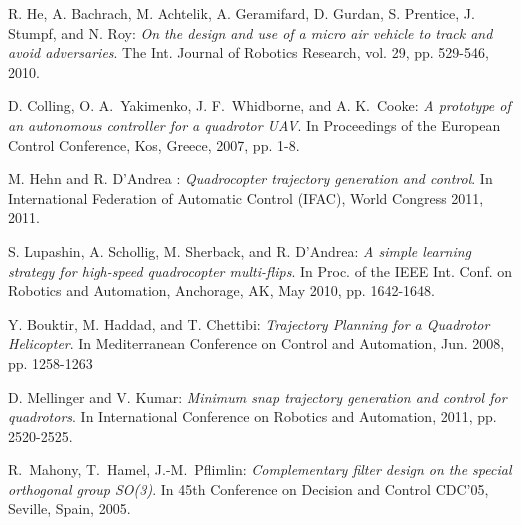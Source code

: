 
\begin{thebibliography}{99}



 {\sc R. He, A. Bachrach, M. Achtelik, A. Geramifard, D. Gurdan, S. Prentice,
J. Stumpf, and N. Roy}: 
{\it On the design and use of a micro air
vehicle to track and avoid adversaries}. The Int. Journal of Robotics
Research, vol. 29, pp. 529-546, 2010.


 {\sc D. Colling, O. A.~Yakimenko, J. F.~Whidborne, and A. K.~Cooke}:
{\it A prototype of an autonomous controller for a quadrotor UAV}. In
Proceedings of the European Control Conference, Kos, Greece, 2007,
pp. 1-8.


 {\sc M. Hehn and R. D'Andrea }:
{\it Quadrocopter trajectory generation and control}. In
International Federation of Automatic Control (IFAC), World Congress 2011, 2011.


 {\sc S. Lupashin, A. Schollig, M. Sherback, and R. D'Andrea}:
 {\it A simple learning strategy for high-speed quadrocopter multi-flips}.
In Proc. of the IEEE Int. Conf. on Robotics and Automation, Anchorage, AK,
May 2010, pp. 1642-1648.


 {\sc Y. Bouktir, M. Haddad, and T. Chettibi}:
{\it Trajectory Planning for a
Quadrotor Helicopter}. In Mediterranean Conference on Control and
Automation, Jun. 2008, pp. 1258-1263


 {\sc D. Mellinger and V. Kumar}: 
{\it Minimum snap trajectory generation and
control for quadrotors}. In International Conference on Robotics and
Automation, 2011, pp. 2520-2525.






 {\sc R.~Mahony, T.~Hamel, J.-M.~Pflimlin}:
{\it Complementary filter design on the special orthogonal group SO(3)}. In 45th Conference
on Decision and Control CDC'05, Seville, Spain, 2005.


\end{thebibliography}
